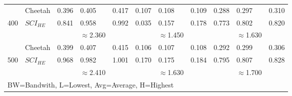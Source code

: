 \begin{tabular}{lllllllllll}
           & Cheetah & 0.396  & 0.405    & 0.417 & 0.107         & 0.108           & 0.109         & 0.288         & 0.297           & 0.310         \\
400        & $SCI_{HE}$ & 0.841  & 0.958    & 0.992 & 0.035         & 0.157           & 0.178         & 0.773         & 0.802           & 0.820         \\ \cline{3-11} 
           &         &        & $\approx$2.360    &       &               & $\approx$1.450           &               &               & $\approx$1.630           &               \\ \hline
           & Cheetah & 0.399  & 0.407    & 0.415 & 0.106         & 0.107           & 0.108         & 0.292         & 0.299           & 0.306         \\
500        & $SCI_{HE}$ & 0.968  & 0.982    & 1.001 & 0.170         & 0.175           & 0.184         & 0.795         & 0.807           & 0.828         \\ \cline{2-11} 
           &         &        & $\approx$2.410    &       &               & $\approx$1.630           &               &               & $\approx$1.700           &               \\ \hline
\multicolumn{11}{l}{BW=Bandwith, L=Lowest, Avg=Average, H=Highest}                                                                                  
\end{tabular}